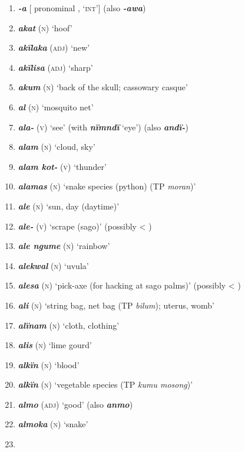\begin{enumerate}[noitemsep, label={}, align=left, widest=190, labelsep=1ex,leftmargin=*,itemindent=-10pt]

\item 
\textbf{\textit{-a}} [ pronominal , ‘\textsc{int}’] (also \textbf{\textit{-awa}}) \item
\textbf{\textit{akat}} (\textsc{n}) ‘hoof’ \item
\textbf{\textit{akïlaka}} (\textsc{adj}) ‘new’ \item
\textbf{\textit{akïlisa}} (\textsc{adj)} ‘sharp’ \item
\textbf{\textit{akum}} (\textsc{n)} ‘back of the skull; cassowary casque’ \item
\textbf{\textit{al}} (\textsc{n)} ‘mosquito net’ \item
\textbf{\textit{ala-}} (\textsc{v}) ‘see’ (with \textbf{\textit{nïmndï}} ‘eye’) (also \textbf{\textit{andï-}}) \item
\textbf{\textit{alam}} \textsc{(n)} ‘cloud, sky’ \item
\textbf{\textit{alam kot-} }(\textsc{v)} ‘thunder’ \item
\textbf{\textit{alamas}} (\textsc{n)} ‘snake species (python) (TP \textit{moran})’ \item
\textbf{\textit{ale}} (\textsc{n)} ‘sun, day (daytime)’ \item
\textbf{\textit{ale-}} (\textsc{v)} ‘scrape (sago)’ (possibly < ) \item
\textbf{\textit{ale ngume}} (\textsc{n)} ‘rainbow’ \item
\textbf{\textit{alekwal}} (\textsc{n)} ‘uvula’ \item
\textbf{\textit{alesa}} (\textsc{n)} ‘pick-axe (for hacking at sago palms)’ (possibly < ) \item
\textbf{\textit{ali}} (\textsc{n)} ‘string bag, net bag (TP \textit{bilum}); uterus, womb’ \item
\textbf{\textit{alïnam}} (\textsc{n)} ‘cloth, clothing’ \item
\textbf{\textit{alis}} (\textsc{n)} ‘lime gourd’ \item
\textbf{\textit{alkïn}} (\textsc{n)} ‘blood’ \item
\textbf{\textit{alkïn}} (\textsc{n)} ‘vegetable species (TP \textit{kumu mosong})’ \item
\textbf{\textit{almo}} (\textsc{adj)} ‘good’ (also \textbf{\textit{anmo}}) \item
\textbf{\textit{almoka}} (\textsc{n)} ‘snake’ \item

\end{enumerate}
